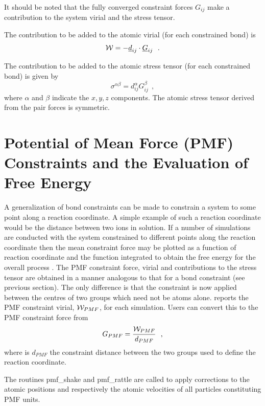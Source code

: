 It should be noted that the fully converged constraint forces
$G_{ij}$ make a contribution to the system virial and the stress
tensor.

The contribution to be added to the atomic virial (for each
constrained bond) is
\begin{equation}
{\cal W} = -\mbox{$\underline{d}$}_{ij} \cdot \mbox{$\underline{G}$}_{ij}~~.
\end{equation}

The contribution to be added to the atomic stress
tensor (for each constrained bond) is given
by
\begin{equation}
\sigma^{\alpha \beta} = d_{ij}^{\alpha} G_{ij}^{\beta}~~,
\end{equation}
where $\alpha$ and $\beta$ indicate the $x,y,z$ components. The
atomic stress tensor derived from the pair forces is symmetric.

\section{Potential of Mean Force (PMF)
Constraints and the Evaluation of Free Energy}\label{pmf}

A generalization of bond constraints can be made to constrain
a system to some point along a reaction coordinate.  A simple
example of such a reaction coordinate would be the distance
between two ions in solution.  If a number of simulations are
conducted with the system constrained to different points along
the reaction coordinate then the mean constraint force may be
plotted as a function of reaction coordinate and the function
integrated to obtain the free energy for the overall process
\cite{mccammon-87a}.  The PMF constraint force, virial and
contributions to the stress tensor are obtained in a manner
analogous to that for a bond constraint (see previous section).
The only difference is that the constraint is now applied
between the centres of two groups which need not be atoms alone.
\D reports the PMF constraint virial, ${\cal W}_{PMF}$, for each
simulation.  Users can convert this to the PMF constraint force from
\begin{equation}
G_{PMF} = \frac {{\cal W}_{PMF}} {d_{PMF}}~~,
\end{equation}
where is $d_{PMF}$ the constraint distance between the two groups
used to define the reaction coordinate.

The routines {\sc pmf\_shake} and {\sc pmf\_rattle} are called to
apply corrections to the atomic positions and respectively the
atomic velocities of all particles constituting PMF units.

